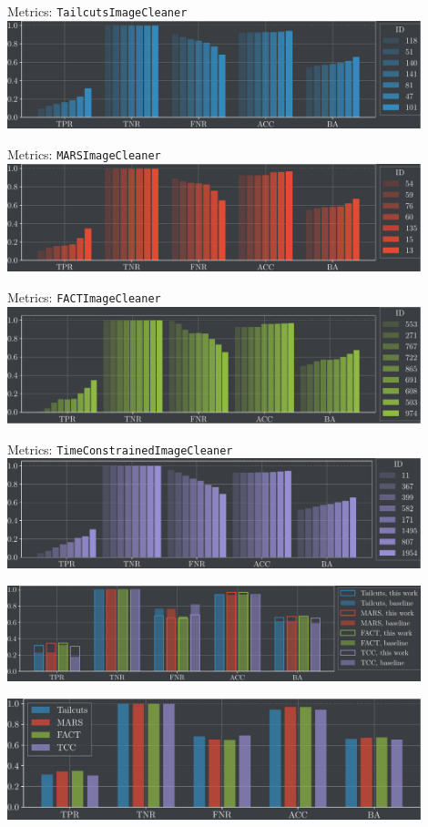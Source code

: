 \begin{frame}{Metrics: \texttt{TailcutsImageCleaner}}
    \centering
    \includegraphics[width=0.9\textwidth]{build/metrics_tailcuts.pdf}
\end{frame}

\begin{frame}{Metrics: \texttt{MARSImageCleaner}}
    \centering
    \includegraphics[width=0.9\textwidth]{build/metrics_mars.pdf}
\end{frame}

\begin{frame}{Metrics: \texttt{FACTImageCleaner}}
    \centering
    \includegraphics[width=0.9\textwidth]{build/metrics_fact.pdf}
\end{frame}

\begin{frame}{Metrics: \texttt{TimeConstrainedImageCleaner}}
    \centering
    \includegraphics[width=0.9\textwidth]{build/metrics_tcc.pdf}
\end{frame}



\begin{frame}
    \centering
    \includegraphics[width=0.9\textwidth]{build/metrics_baseline.pdf}
\end{frame}

\begin{frame}
    \centering
    \includegraphics[width=0.9\textwidth]{build/metrics_all.pdf}
\end{frame}